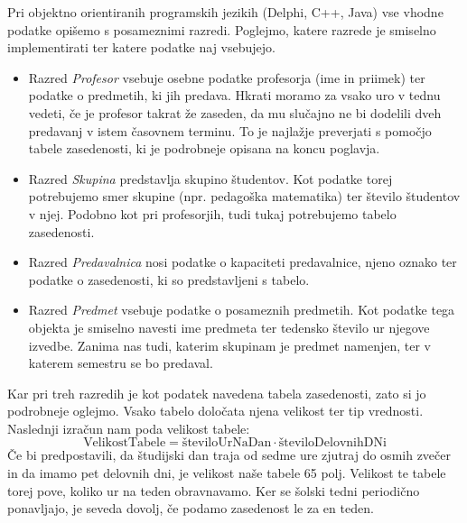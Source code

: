 \documentclass[a4paper, 10pt]{article}
\begin{document}
Pri objektno orientiranih programskih jezikih (Delphi, C++, Java) vse vhodne podatke
opišemo s posameznimi razredi. Poglejmo, katere razrede je smiselno implementirati ter
katere podatke naj vsebujejo.


\begin{itemize}
   
   \item Razred \emph{Profesor} vsebuje osebne podatke profesorja (ime in priimek) ter
   podatke o predmetih, ki jih predava. Hkrati moramo za vsako uro v tednu vedeti, če
   je profesor takrat že zaseden, da mu slučajno ne bi dodelili dveh predavanj v istem
   časovnem terminu. To je najlažje preverjati s pomočjo tabele zasedenosti, ki je
   podrobneje opisana na koncu poglavja.

   \item Razred \emph{Skupina} predstavlja skupino študentov. Kot podatke torej potrebujemo
   smer skupine (npr. pedagoška matematika) ter število študentov v njej. Podobno kot pri
   profesorjih, tudi tukaj potrebujemo tabelo zasedenosti.

   \item Razred \emph{Predavalnica} nosi podatke o kapaciteti predavalnice, njeno oznako
   ter podatke o zasedenosti, ki so predstavljeni s tabelo.

   \item Razred \emph{Predmet} vsebuje podatke o posameznih predmetih. Kot podatke tega
   objekta je smiselno navesti ime predmeta ter tedensko število ur njegove izvedbe.
   Zanima nas tudi, katerim skupinam je predmet namenjen, ter v katerem semestru se bo
   predaval.
   \end{itemize}
%
Kar pri treh razredih je kot podatek navedena tabela zasedenosti, zato si jo podrobneje
oglejmo. Vsako tabelo določata njena velikost ter tip vrednosti. Naslednji izračun nam
poda velikost tabele:
\[\text{VelikostTabele} = \text{številoUrNaDan} \cdot \text{številoDelovnihDNi}\]
Če bi predpostavili, da študijski dan traja od sedme ure zjutraj do osmih zvečer in da
imamo pet delovnih dni, je velikost naše tabele 65 polj. Velikost te tabele torej pove,
koliko ur na teden obravnavamo. Ker se šolski tedni periodično ponavljajo, je seveda
dovolj, če podamo zasedenost le za en teden.
\end{document}
